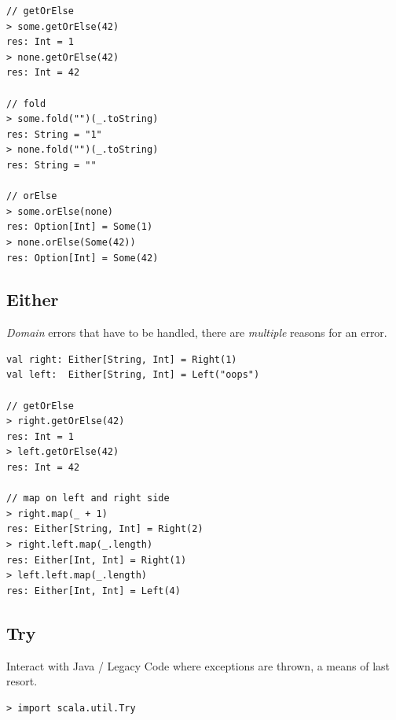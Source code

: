 \documentclass[10pt,landscape,a4paper]{article}
\begin{document}
\begin{multicols*}{4}
\begin{verbatim}
// getOrElse
> some.getOrElse(42)
res: Int = 1
> none.getOrElse(42)
res: Int = 42

// fold
> some.fold("")(_.toString)
res: String = "1"
> none.fold("")(_.toString)
res: String = ""

// orElse
> some.orElse(none)
res: Option[Int] = Some(1)
> none.orElse(Some(42))
res: Option[Int] = Some(42)

\end{verbatim}
  \subsection{Either}
  \begin{mdframed}
    \footnotesize
    \textit{Domain} errors that have to be handled, there are
    \textit{multiple} reasons for an error.
  \end{mdframed}
  \begin{center}
  \end{center}
\begin{verbatim}
val right: Either[String, Int] = Right(1)
val left:  Either[String, Int] = Left("oops")

// getOrElse
> right.getOrElse(42)
res: Int = 1
> left.getOrElse(42)
res: Int = 42

// map on left and right side
> right.map(_ + 1)
res: Either[String, Int] = Right(2)
> right.left.map(_.length)
res: Either[Int, Int] = Right(1)
> left.left.map(_.length)
res: Either[Int, Int] = Left(4)
\end{verbatim}
  \subsection{Try}
  \begin{mdframed}
    \footnotesize
    Interact with Java / Legacy Code where exceptions are thrown, a
    means of last resort.
  \end{mdframed}
  \begin{center}
  \end{center}
\begin{verbatim}
> import scala.util.Try


\end{verbatim}
\end{multicols*}
\end{document}
